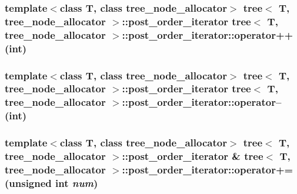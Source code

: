 \hypertarget{classtree_1_1post__order__iterator_7041325e846017886e7c43d9c1c2cddb}{
\subsubsection{\setlength{\rightskip}{0pt plus 5cm}template$<$class T, class tree\_\-node\_\-allocator$>$ {\bf tree}$<$ T, tree\_\-node\_\-allocator $>$::{\bf post\_\-order\_\-iterator} {\bf tree}$<$ T, tree\_\-node\_\-allocator $>$::post\_\-order\_\-iterator::operator++ (int)}}
\label{classtree_1_1post__order__iterator_7041325e846017886e7c43d9c1c2cddb}


\hypertarget{classtree_1_1post__order__iterator_f2c0df6c235853aa2191d02a557a1fea}{
\subsubsection{\setlength{\rightskip}{0pt plus 5cm}template$<$class T, class tree\_\-node\_\-allocator$>$ {\bf tree}$<$ T, tree\_\-node\_\-allocator $>$::{\bf post\_\-order\_\-iterator} {\bf tree}$<$ T, tree\_\-node\_\-allocator $>$::post\_\-order\_\-iterator::operator-- (int)}}
\label{classtree_1_1post__order__iterator_f2c0df6c235853aa2191d02a557a1fea}


\hypertarget{classtree_1_1post__order__iterator_0b6c2246f41b0a2ff8e4c9d9efcee879}{
\subsubsection{\setlength{\rightskip}{0pt plus 5cm}template$<$class T, class tree\_\-node\_\-allocator$>$ {\bf tree}$<$ T, tree\_\-node\_\-allocator $>$::{\bf post\_\-order\_\-iterator} \& {\bf tree}$<$ T, tree\_\-node\_\-allocator $>$::post\_\-order\_\-iterator::operator+= (unsigned int {\em num})}}
\label{classtree_1_1post__order__iterator_0b6c2246f41b0a2ff8e4c9d9efcee879}


